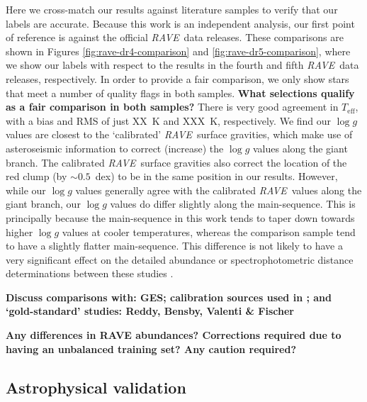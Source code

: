 \documentclass[preprint,trackchanges]{aastex}
\newcommand{\acronym}[1]{{\small{#1}}}
\newcommand{\project}[1]{\textsl{#1}}
\newcommand{\rave}{\project{\acronym{RAVE}}}
\newcommand{\stub}[1]{{\color{blue} \textbf{#1}}}
\newcommand{\teff}{T_{\mathrm{eff}}}
\newcommand{\logg}{\log g}
\begin{document}
Here we cross-match our results against literature samples to verify that
our labels are accurate.  Because this work is an independent analysis, our
first point of reference is against the official \rave\ data releases.  These
comparisons are shown in Figures \ref{fig:rave-dr4-comparison} and 
\ref{fig:rave-dr5-comparison}, where we show our labels with respect to the
results in the fourth and fifth \rave\ data releases, respectively.  In order
to provide a fair comparison, we only show stars that meet a number of quality
flags in both samples. 
\stub{What selections qualify as a fair comparison in both samples?}
There is very good agreement in $\teff$, with a bias
and RMS of just XX~K and XXX~K, respectively.  We find our $\logg$ values are
closest to the `calibrated' \rave\ surface gravities, which make use of 
asteroseismic information to correct (increase) the $\logg$ values along the
giant branch.  The calibrated \rave\ surface gravities also correct the 
location of the red clump (by $\sim0.5$~dex) to be in the same position in our
results.  However, while our $\logg$ values generally agree with the calibrated
\rave\ values along the giant branch, our $\logg$ values do differ slightly 
along the main-sequence.  This is principally because the main-sequence in 
this work tends to taper down towards higher $\logg$ values at cooler 
temperatures, whereas the comparison sample tend to have a slightly flatter
main-sequence.  This difference is not likely to have a very significant 
effect on the detailed abundance or spectrophotometric distance determinations
between these studies \citep{Binney_2014}.





\stub{Discuss comparisons with: GES; calibration sources used in \citet{Kordopatis_2013}; and `gold-standard' studies: Reddy, Bensby, Valenti \& Fischer}

\stub{Any differences in RAVE abundances? Corrections required due to having an unbalanced training set? Any caution required?}


\subsection{Astrophysical validation}
\label{sec:astrophysical-validation}
\end{document}
